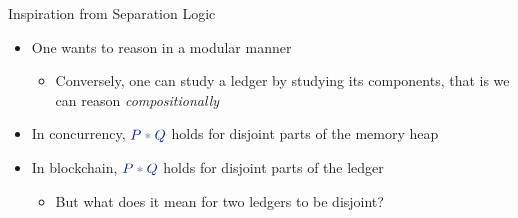 \documentclass[aspectratio=169]{beamer}
\newcommand*{\mathcolor}{}
\def\mathcolor#1#{\mathcoloraux{#1}}
\newcommand*{\mathcoloraux}[3]{%
  \protect\leavevmode
  \begingroup
    \color#1{#2}#3%
  \endgroup
}
\newcommand{\HSSym}[1]{\mathcolor{hsblue4}{\ensuremath{#1}}}
\newcommand{\HSCon}[1]{\mathcolor{hsblue3}{#1}}
\begin{document}
\begin{frame}{Inspiration from Separation Logic}
\begin{itemize}
\item One wants to reason in a modular manner
  \begin{itemize}
  \item Conversely, one can study a ledger by studying its components, that is we can reason \textit{compositionally}
  \end{itemize}
\item In concurrency, \ensuremath{\HSCon{P}\HSSym{\ast}\HSCon{Q}} holds for disjoint parts of the memory heap
\item In blockchain, \ensuremath{\HSCon{P}\HSSym{\ast}\HSCon{Q}} holds for disjoint parts of the ledger
  \begin{itemize}
  \item But what does it mean for two ledgers to be disjoint?
  \end{itemize}
\end{itemize}
\end{frame}
\end{document}
